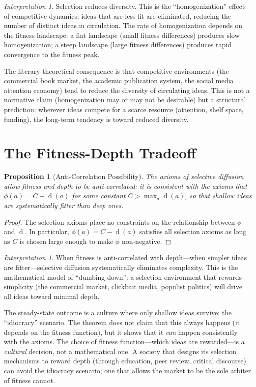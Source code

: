 \documentclass[11pt,openany]{book}
\theoremstyle{definition}
\theoremstyle{plain}
\newtheorem{proposition}[axiom]{Proposition}
\theoremstyle{remark}
\newtheorem{interpretation}[axiom]{Interpretation}
\newcommand{\depth}{\operatorname{d}}       %
\begin{document}
\begin{interpretation}
Selection reduces diversity. This is the ``homogenization'' effect of competitive dynamics: ideas that are less fit are eliminated, reducing the number of distinct ideas in circulation. The rate of homogenization depends on the fitness landscape: a flat landscape (small fitness differences) produces slow homogenization; a steep landscape (large fitness differences) produces rapid convergence to the fitness peak.

The literary-theoretical consequence is that competitive environments (the commercial book market, the academic publication system, the social media attention economy) tend to reduce the diversity of circulating ideas. This is not a normative claim (homogenization may or may not be desirable) but a structural prediction: wherever ideas compete for a scarce resource (attention, shelf space, funding), the long-term tendency is toward reduced diversity.
\end{interpretation}

\section{The Fitness-Depth Tradeoff}

\begin{proposition}[Anti-Correlation Possibility]
The axioms of selective diffusion allow fitness and depth to be anti-correlated: it is consistent with the axioms that $\phi(a) = C - \depth(a)$ for some constant $C > \max_a \depth(a)$, so that shallow ideas are systematically fitter than deep ones.
\end{proposition}

\begin{proof}
The selection axioms place no constraints on the relationship between $\phi$ and $\depth$. In particular, $\phi(a) = C - \depth(a)$ satisfies all selection axioms as long as $C$ is chosen large enough to make $\phi$ non-negative.
\end{proof}

\begin{interpretation}
When fitness is anti-correlated with depth---when simpler ideas are fitter---selective diffusion systematically eliminates complexity. This is the mathematical model of ``dumbing down'': a selection environment that rewards simplicity (the commercial market, clickbait media, populist politics) will drive all ideas toward minimal depth.

The steady-state outcome is a culture where only shallow ideas survive: the ``idiocracy'' scenario. The theorem does not claim that this always happens (it depends on the fitness function), but it shows that it \emph{can} happen consistently with the axioms. The choice of fitness function---which ideas are rewarded---is a \emph{cultural} decision, not a mathematical one. A society that designs its selection mechanisms to reward depth (through education, peer review, critical discourse) can avoid the idiocracy scenario; one that allows the market to be the sole arbiter of fitness cannot.
\end{interpretation}
\end{document}
